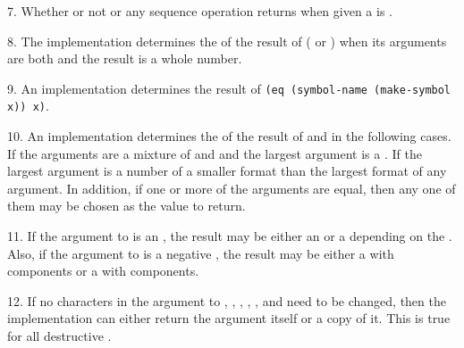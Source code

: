 \item{7.}  
Whether or not  or any sequence operation returns when given 
a  is .

\item{8.}
The implementation determines the  of the result of 
( or ) when its arguments are both
 and the result is a whole number.
 

\item{9.} An implementation determines the result of 
{\tt (eq (symbol-name (make-symbol x)) x)}.
                                       
\item{10.} 
An implementation determines the  
of the result of  and  in the following cases.
\beginlist
{}
If the arguments are a mixture of  and 
and the largest argument is a .
 If the largest argument is a  number of a smaller format
than the largest format of any  argument.
\endlist
In addition, if one or more of the arguments are equal, then any one
of them may be chosen as the value to return.

\item{11.} If the argument to  is an ,
the result may be either an  or a  depending on the
.  Also, if the argument to 
is a negative , the result may be either
a  with  components or
a  with  components.

\item{12.} If no characters in the argument to ,
, , 
, , and
 need to be changed, then the implementation can
either return the argument itself or a copy of it.
This is true for all destructive .

